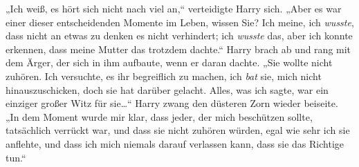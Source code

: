 „Ich weiß, es hört sich nicht nach viel an,“ verteidigte Harry sich. „Aber es war einer dieser entscheidenden Momente im Leben, wissen Sie? Ich meine, ich \emph{wusste}, dass nicht an etwas zu denken es nicht verhindert; ich \emph{wusste} das, aber ich konnte erkennen, dass meine Mutter das trotzdem dachte.“ Harry brach ab und rang mit dem Ärger, der sich in ihm aufbaute, wenn er daran dachte. „Sie wollte nicht zuhören. Ich versuchte, es ihr begreiflich zu machen, ich \emph{bat} sie, mich nicht hinauszuschicken, doch sie hat darüber gelacht. Alles, was ich sagte, war ein einziger großer Witz für sie…“ Harry zwang den düsteren Zorn wieder beiseite. „In dem Moment wurde mir klar, dass jeder, der mich beschützen sollte, tatsächlich verrückt war, und dass sie nicht zuhören würden, egal wie sehr ich sie anflehte, und dass ich mich niemals darauf verlassen kann, dass sie das Richtige tun.“

